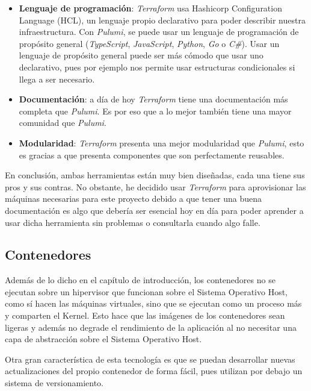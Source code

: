 \begin{itemize}
	\item \textbf{Lenguaje de programación}: \textit{Terraform} usa Hashicorp Configuration Language (HCL), un lenguaje propio declarativo para poder describir nuestra infraestructura. Con \textit{Pulumi}, se puede usar un lenguaje de programación de propósito general (\textit{TypeScript}, \textit{JavaScript}, \textit{Python}, \textit{Go} o \textit{C\#}). Usar un lenguaje de propósito general puede ser más cómodo que usar uno declarativo, pues por ejemplo nos permite usar estructuras condicionales si llega a ser necesario.
	\item \textbf{Documentación}: a día de hoy \textit{Terraform} tiene una documentación más completa que \textit{Pulumi}. Es por eso que a lo mejor también tiene una mayor comunidad que \textit{Pulumi}.
	\item \textbf{Modularidad}: \textit{Terraform} presenta una mejor modularidad que \textit{Pulumi}, esto es gracias a que presenta componentes que son perfectamente reusables.
\end{itemize}

En conclusión, ambas herramientas están muy bien diseñadas, cada una tiene sus pros y sus contras. No obstante, he decidido usar \textit{Terraform} para aprovisionar las máquinas necesarias para este proyecto debido a que tener una buena documentación es algo que debería ser esencial hoy en día para poder aprender a usar dicha herramienta sin problemas o consultarla cuando algo falle.

\subsection{Contenedores}

Además de lo dicho en el capítulo de introducción, los contenedores no se ejecutan sobre un hipervisor que funcionan sobre el Sistema Operativo Host, como sí hacen las máquinas virtuales, sino que se ejecutan como un proceso más y comparten el Kernel. Esto hace que las imágenes de los contenedores sean ligeras y además no degrade el rendimiento de la aplicación al no necesitar una capa de abstracción sobre el Sistema Operativo Host.\newline

Otra gran característica de esta tecnología es que se puedan desarrollar nuevas actualizaciones del propio contenedor de forma fácil, pues utilizan por debajo un sistema de versionamiento.


